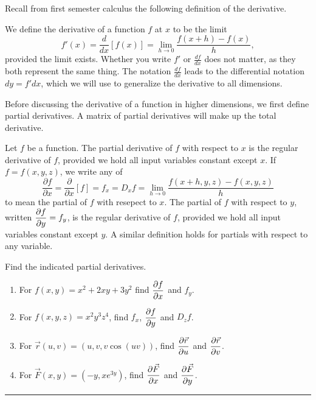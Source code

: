 Recall from first semester calculus the following definition of the derivative.
\begin{dfn}
We define the derivative of a function $f$ at $x$ to be the limit
$$f'(x)=\frac{d}{dx}[f(x)]=\lim_{h\to 0}\frac{f(x+h)-f(x)}{h},$$
provided the limit exists. Whether you write $f'$ or $\frac{df}{dx}$ does not matter, as they both represent the same thing.  The notation $\frac{df}{dx}$ leads to the differential notation $dy=f'dx$, which we will use to generalize the derivative to all dimensions.
\end{dfn}
Before discussing the derivative of a function in higher dimensions, we first define partial derivatives. A matrix of partial derivatives will make up the total derivative.
\begin{dfn}
 Let $f$ be a function.  The partial derivative of $f$ with respect to $x$ is the regular derivative of $f$, provided we hold all input variables constant except $x$.  If $f=f(x,y,z)$, we write any of 
 $$\frac{\partial f}{\partial x}=\frac{\partial}{\partial x}[f]=f_x = D_x f=\lim_{h\to 0}\frac{f(x+h,y,z)-f(x,y,z)}{h}$$
to mean the partial of $f$ with resepect to $x$.
 The partial of $f$ with respect to $y$, written $\displaystyle \frac{\partial f}{\partial y}=f_y$, is the regular derivative of $f$, provided we hold all input variables constant except $y$. A similar definition holds for partials with respect to any variable.
\end{dfn}

\begin{problem}%
 Find the indicated partial derivatives.
\begin{enumerate}
 \item For $f(x,y)=x^2+2xy+3y^2$ find $\displaystyle\frac{\partial f}{\partial x}$ and $f_y$.
 \item For $f(x,y,z)=x^2y^3z^4$, find $f_x$, $\displaystyle\frac{\partial f}{\partial y}$ and $D_z f$.
 \item For $\vec r(u,v) = (u,v,v\cos(uv))$, find $\displaystyle\frac{\partial \vec r}{\partial u}$ and $\displaystyle\frac{\partial \vec r}{\partial v}$. 
 \item For $\vec F(x,y) = (-y,xe^{3y})$, find $\displaystyle\frac{\partial \vec F}{\partial x}$ and $\displaystyle\frac{\partial \vec F}{\partial y}$.
\end{enumerate}
\hrule\end{problem}

